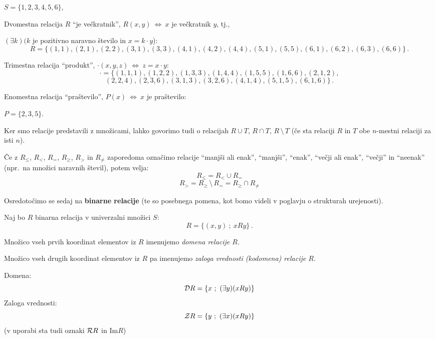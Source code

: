 \documentclass[11pt,paper=b5,footinclude,headinclude]{scrbook} %
\newcounter{example}
\def\brez {{\,\setminus\,}}
\def\cee {{~\Leftrightarrow~}}
\begin{document}
\bigskip


\begin{example*}

$S = \{1,2,3,4,5,6\}$,

Dvomestna relacija $R$ ``je večkratnik'', $R(x,y) \cee x$ je večkratnik $y$, tj.,

$(\exists k)(k$ je pozitivno naravno število in $x = k\cdot y$):
$$R = \{(1,1),(2,1),(2,2),(3,1),(3,3),(4,1),(4,2),(4,4),(5,1),(5,5),(6,1),(6,2),(6,3),(6,6)\}\,.$$

Trimestna relacija ``produkt'', $\cdot(x,y,z) \cee z = x\cdot y$:
$$\cdot  = \{(1,1,1),(1,2,2),(1,3,3),(1,4,4),(1,5,5),(1,6,6),(2,1,2),$$$$(2,2,4),(2,3,6),(3,1,3),(3,2,6),(4,1,4),(5,1,5),(6,1,6)\}\,.$$


Enomestna relacija ``praštevilo'', $P(x) \cee x$ je praštevilo:

$P = \{2,3,5\}$.
\end{example*}

\bigskip

Ker smo relacije predstavili z množicami, lahko govorimo tudi o relacijah
$R\cup T$, $R\cap T$, $R\brez T$ (če sta relaciji $R$ in $T$ obe $n$-mestni relaciji za isti $n$).

\bigskip
\begin{example*}
Če z $R_{\leq}$, $R_{<}$, $R_{=}$, $R_{\ge}$, $R_{>}$ in $R_{\neq}$
zaporedoma označimo relacije ``manjši ali enak'', ``manjši'', ``enak'',
``večji ali enak'', ``večji'' in ``neenak'' (npr.~na množici naravnih števil), potem velja:
$$R_\leq = R_< \cup R_=$$
$$R_> = R_\ge \brez R_= = R_\ge \cap R_{\neq}$$
\end{example*}


Osredotočimo se sedaj na \textbf{ binarne relacije} (te so posebnega pomena, kot bomo videli v poglavju o strukturah urejenosti).

Naj bo $R$ binarna relacija v univerzalni množici $S$:
$$R = \{(x,y)~;~xRy\}\,.$$

Množico vseh prvih koordinat elementov iz $R$ imenujemo {\em domena relacije $R$.}

Množico vseh drugih koordinat elementov iz $R$ pa imenujemo {\em zaloga vrednosti (kodomena) relacije $R$.}

Domena: $${\cal D}R = \{x~;~(\exists y)(xRy)\}$$
Zaloga vrednosti: $${\cal Z}R = \{y~;~(\exists x)(xRy)\}$$
(v uporabi sta tudi oznaki ${\cal R} R$ in $\textrm{Im} R$)
\end{document}
